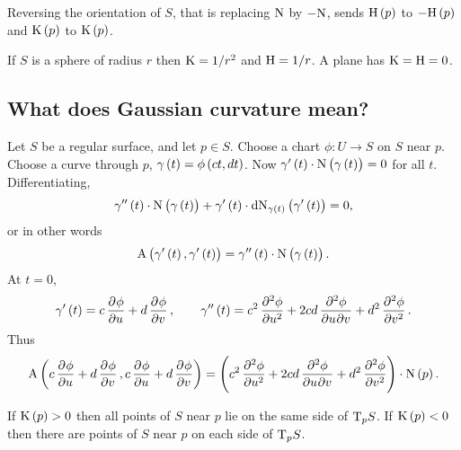 Reversing the orientation of $ S $, that is replacing $ \mathrm{N} $ by $ -\mathrm{N} $, sends $ \H\br{p} $ to $ -\H\br{p} $ and $ \K\br{p} $ to $ \K\br{p} $.

\begin{example*}
If $ S $ is a sphere of radius $ r $ then $ \mathrm{K} = 1 / r^2 $ and $ \mathrm{H} = 1 / r $. A plane has $ \mathrm{K} = \mathrm{H} = 0 $.
\end{example*}

\pagebreak

\subsection{What does Gaussian curvature mean?}

Let $ S $ be a regular surface, and let $ p \in S $. Choose a chart $ \phi : U \to S $ on $ S $ near $ p $. Choose a curve through $ p $, $ \gamma\br{t} = \phi\br{ct, dt} $. Now $ \gamma'\br{t} \cdot \N\br{\gamma\br{t}} = 0 $ for all $ t $. Differentiating,
$$ \gamma''\br{t} \cdot \N\br{\gamma\br{t}} + \gamma'\br{t} \cdot \d\N_{\gamma\br{t}}\br{\gamma'\br{t}} = 0, $$
or in other words
$$ \A\br{\gamma'\br{t}, \gamma'\br{t}} = \gamma''\br{t} \cdot \N\br{\gamma\br{t}}. $$
At $ t = 0 $,
$$ \gamma'\br{t} = c\dpd{\phi}{u} + d\dpd{\phi}{v}, \qquad \gamma''\br{t} = c^2\dpd[2]{\phi}{u} + 2cd\dmd{\phi}{2}{u}{}{v}{} + d^2\dpd[2]{\phi}{v}. $$
Thus
$$ \A\br{c\dpd{\phi}{u} + d\dpd{\phi}{v}, c\dpd{\phi}{u} + d\dpd{\phi}{v}} = \br{c^2\dpd[2]{\phi}{u} + 2cd\dmd{\phi}{2}{u}{}{v}{} + d^2\dpd[2]{\phi}{v}} \cdot \N\br{p}. $$

\begin{proposition}
If $ \K\br{p} > 0 $ then all points of $ S $ near $ p $ lie on the same side of $ \mathrm{T}_p S $. If $ \K\br{p} < 0 $ then there are points of $ S $ near $ p $ on each side of $ \mathrm{T}_p S $.
\end{proposition}

